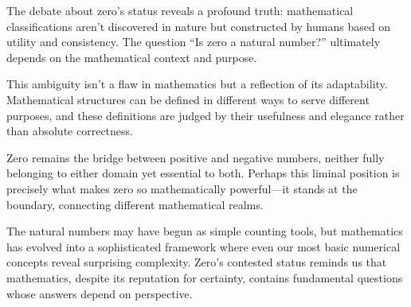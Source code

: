 The debate about zero's status reveals a profound truth: mathematical classifications aren't discovered in nature but constructed by humans based on utility and consistency. The question ``Is zero a natural number?'' ultimately depends on the mathematical context and purpose.

This ambiguity isn't a flaw in mathematics but a reflection of its adaptability. Mathematical structures can be defined in different ways to serve different purposes, and these definitions are judged by their usefulness and elegance rather than absolute correctness.

Zero remains the bridge between positive and negative numbers, neither fully belonging to either domain yet essential to both. Perhaps this liminal position is precisely what makes zero so mathematically powerful---it stands at the boundary, connecting different mathematical realms.

The natural numbers may have begun as simple counting tools, but mathematics has evolved into a sophisticated framework where even our most basic numerical concepts reveal surprising complexity. Zero's contested status reminds us that mathematics, despite its reputation for certainty, contains fundamental questions whose answers depend on perspective.
